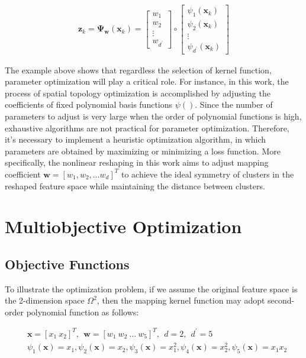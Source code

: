 \begin{align}
\mathbf{z}_k
=\mathbf{\Psi_{w}} (\mathbf{x}_k) = 
\begin{bmatrix}
w_{1}  \\
w_{2}   \\
\vdots \\
w_{d^\prime} 
\end{bmatrix}
\circ
\begin{bmatrix}
\psi_1(\mathbf{x}_k)\\
\psi_2(\mathbf{x}_k)\\
\vdots\\
\psi_{d^\prime}(\mathbf{x}_k)
\end{bmatrix}
\label{eq:z}
\end{align}

The example above shows that regardless the selection of kernel function, parameter optimization will play a critical role. For instance, in this work, the process of spatial topology optimization is accomplished by adjusting the coefficients of fixed polynomial basis functions $\psi()$. Since the number of parameters to adjust is very large when the order of polynomial functions is high, exhaustive algorithms are not practical for parameter optimization. Therefore, it's necessary to implement a heuristic optimization algorithm, in which parameters are obtained by maximizing or minimizing a loss function. More specifically, the nonlinear reshaping in this work aims to adjust mapping coefficient  $\mathbf{w} = [w_1,w_2,\dots w_d]^T$ to achieve the ideal symmetry of clusters in the reshaped feature space while maintaining the distance between clusters.


\section{Multiobjective Optimization}

\subsection{Objective Functions}

To illustrate the optimization problem, if we assume the original feature space is the 2-dimension space $\Omega^2$, then the mapping kernel function may adopt second-order polynomial function as follows:

\begin{align}
\nonumber
&\mathbf{x}=[x_1~ x_2]^T,~~ \mathbf{w}=[w_1~ w_2~ \dots~ w_5]^T,~~d=2, ~~d^\prime=5\\
&\psi_1(\mathbf{x})=x_1, \psi_2(\mathbf{x})=x_2, \psi_3(\mathbf{x})=x_1^2, \psi_4(\mathbf{x})=x_2^2, \psi_5(\mathbf{x})=x_1x_2
\label{eq5}
\end{align}

